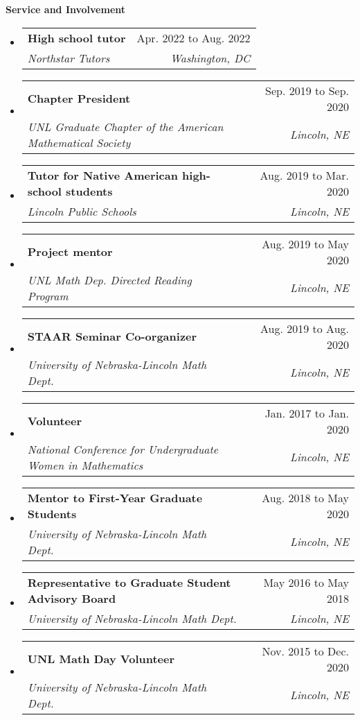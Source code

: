 \documentclass[letterpaper,11pt]{article}
\makeatletter
\newcommand{\resheading}[1]{{\large \colorbox{mygrey}{\begin{minipage}{\textwidth}{\textbf{#1 \vphantom{p\^{E}}}}\end{minipage}}}}
\newcommand{\ressubheading}[4]{
\begin{tabular*}{6.5in}{l@{\extracolsep{\fill}}r}
		\textbf{#1} & #2 \\
		\textit{#3} & \textit{#4} \\
\end{tabular*}\vspace{-6pt}}
\makeatother
\begin{document}
\begin{samepage}	
\resheading{Service and Involvement}
	\begin{itemize}
		\item
			\ressubheading{High school tutor}{Apr. 2022 to Aug. 2022}{Northstar Tutors}{Washington, DC}
		\item
			\ressubheading{Chapter President}{Sep. 2019 to Sep. 2020}{UNL Graduate Chapter of the American Mathematical Society}{Lincoln, NE}
		\item 
			\ressubheading{Tutor for Native American high-school students}{Aug. 2019 to Mar. 2020}{Lincoln Public Schools}{Lincoln, NE}
		\item
			\ressubheading{Project mentor}{Aug. 2019 to May 2020}{UNL Math Dep. Directed Reading Program}{Lincoln, NE}
		\item
			\ressubheading{STAAR Seminar Co-organizer}{Aug. 2019 to Aug. 2020}{University of Nebraska-Lincoln Math Dept.}{Lincoln, NE}
		\item
			\ressubheading{Volunteer}{Jan. 2017 to Jan. 2020}{National Conference for Undergraduate Women in Mathematics}{Lincoln, NE}
		\item
			\ressubheading{Mentor to First-Year Graduate Students}{Aug. 2018 to May 2020}{University of Nebraska-Lincoln Math Dept.}{Lincoln, NE}
		\item
			\ressubheading{Representative to Graduate Student Advisory Board}{May 2016 to May 2018}{University of Nebraska-Lincoln Math Dept.}{Lincoln, NE}
		\item
			\ressubheading{UNL Math Day Volunteer}{Nov. 2015 to Dec. 2020}{University of Nebraska-Lincoln Math Dept.}{Lincoln, NE}
		
	\end{itemize}			
\end{samepage}
			
%
\end{document}
